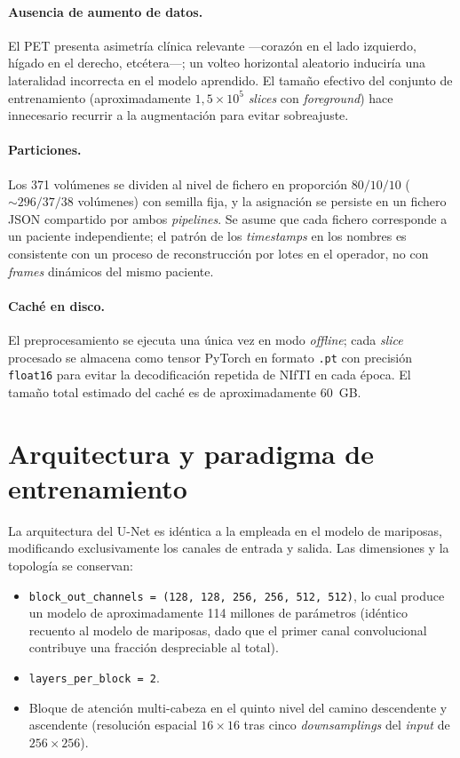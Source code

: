 \paragraph{Ausencia de aumento de datos.}
El PET presenta asimetría clínica relevante —corazón en el lado
izquierdo, hígado en el derecho, etcétera—; un volteo horizontal
aleatorio induciría una lateralidad incorrecta en el modelo
aprendido. El tamaño efectivo del conjunto de entrenamiento
(aproximadamente $1{,}5 \times 10^{5}$ \textit{slices} con
\textit{foreground}) hace innecesario recurrir a la
augmentación para evitar sobreajuste.

\paragraph{Particiones.}
Los 371 volúmenes se dividen al nivel de fichero en proporción
$80 / 10 / 10$ ($\sim 296 / 37 / 38$ volúmenes) con semilla fija,
y la asignación se persiste en un fichero JSON compartido por
ambos \textit{pipelines}. Se asume que cada fichero corresponde
a un paciente independiente; el patrón de los \textit{timestamps}
en los nombres es consistente con un proceso de reconstrucción
por lotes en el operador, no con \textit{frames} dinámicos del
mismo paciente.

\paragraph{Caché en disco.}
El preprocesamiento se ejecuta una única vez en modo
\textit{offline}; cada \textit{slice} procesado se almacena como
tensor PyTorch en formato \texttt{.pt} con precisión
\texttt{float16} para evitar la decodificación repetida de
NIfTI en cada época. El tamaño total estimado del caché es de
aproximadamente 60~GB.

\section{Arquitectura y paradigma de entrenamiento}
\label{sec:pet-arquitectura}

La arquitectura del U-Net es idéntica a la empleada en el modelo
de mariposas, modificando exclusivamente los canales de entrada
y salida. Las dimensiones y la topología se conservan:

\begin{itemize}[leftmargin=*]
    \item \texttt{block\_out\_channels = (128, 128, 256, 256, 512,
    512)}, lo cual produce un modelo de aproximadamente 114
    millones de parámetros (idéntico recuento al modelo de
    mariposas, dado que el primer canal convolucional contribuye
    una fracción despreciable al total).
    \item \texttt{layers\_per\_block = 2}.
    \item Bloque de atención multi-cabeza en el quinto nivel del
    camino descendente y ascendente (resolución espacial
    $16 \times 16$ tras cinco \textit{downsamplings} del
    \textit{input} de $256 \times 256$).
\end{itemize}

